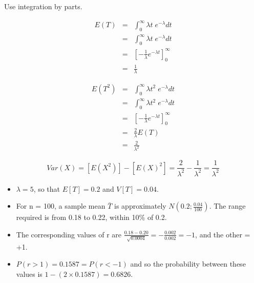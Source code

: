 \documentclass[a4paper,12pt]{article}
\begin{document}
\begin{enumerate}
Use integration by parts.


\begin{eqnarray*}
E(T) &=& \int^{\infty}_{0} \lambda t\;e^{-\lambda} dt \\
    &=&\int^{\infty}_{0} \lambda t\;e^{-\lambda} dt \\
    &=& \left[ -\frac{1}{\lambda}e^{-\lambda t} \right]^{\infty}_{0}\\
    &=& \frac{1}{\lambda}  
\end{eqnarray*}

\begin{eqnarray*}
E(T^2) &=& \int^{\infty}_{0} \lambda t^2\;e^{-\lambda} dt \\
    &=&\int^{\infty}_{0} \lambda t^2\;e^{-\lambda} dt \\
    &=& \left[ -\frac{1}{\lambda}e^{-\lambda t} \right]^{\infty}_{0}\\
    &=& \frac{2}{\lambda}E(T)\\
    &=& \frac{2}{\lambda^2}  
\end{eqnarray*}

\[ Var(X) = [E(X^2)] - [E(X)^2] = \frac{2}{\lambda^2} - \frac{1}{\lambda^2} 
     = \frac{1}{\lambda^2} \]
\begin{itemize}
\item $\lambda = 5$, so that $E[T] = 0.2$ and $V[T] = 0.04$. 

\item For n = 100, a sample mean
$\bar{T}$ is approximately $N(0.2; \frac{0.04}{100})$. The range required is from 0.18 to 0.22,
within 10\% of 0.2. 
\item The corresponding values of r are $\frac{0.18- 0.20}{\sqrt{0.0004}} = -\frac{0.002}{0.002} = -1$,
and the other = +1. 
\item $P(r > 1) = 0.1587 = P(r < -1)$ and so the probability
between these values is $1 - (2 \times 0.1587) = 0.6826$.
\end{itemize}
\end{enumerate}
\end{document}
